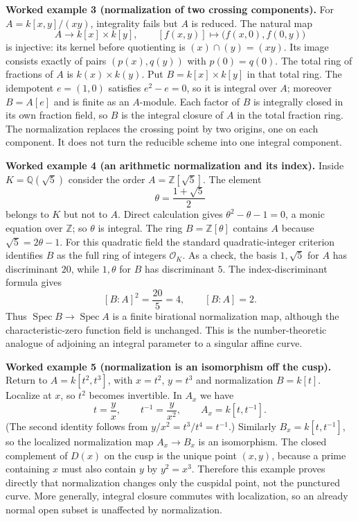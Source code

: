 \par\medskip
\noindent\textbf{Worked example 3 (normalization of two crossing components).}
For $A=k[x,y]/(xy)$, integrality fails but $A$ is reduced.
The natural map
\[
 A\longrightarrow k[x]\times k[y],\qquad
 [f(x,y)]\longmapsto\bigl(f(x,0),f(0,y)\bigr)
\]
is injective: its kernel before quotienting is $(x)\cap(y)=(xy)$.
Its image consists exactly of pairs $(p(x),q(y))$ with
$p(0)=q(0)$.  The total ring of fractions of $A$ is
$k(x)\times k(y)$.  Put $B=k[x]\times k[y]$ in that total ring.
The idempotent $e=(1,0)$ satisfies $e^2-e=0$, so it is integral over
$A$; moreover $B=A[e]$ and is finite as an $A$-module.
Each factor of $B$ is integrally closed in its own fraction field,
so $B$ is the integral closure of $A$ in the total fraction ring.
The normalization replaces the crossing point by two origins, one
on each component.  It does not turn the reducible scheme into one
integral component.

\par\medskip
\noindent\textbf{Worked example 4 (an arithmetic normalization and its index).}
Inside $K=\mathbb Q(\sqrt5)$ consider the order
$A=\mathbb Z[\sqrt5]$.  The element
\[
 \theta=\frac{1+\sqrt5}{2}
\]
belongs to $K$ but not to $A$.  Direct calculation gives
$\theta^2-\theta-1=0$, a monic equation over $\mathbb Z$;
so $\theta$ is integral.  The ring
$B=\mathbb Z[\theta]$ contains $A$ because $\sqrt5=2\theta-1$.
For this quadratic field the standard quadratic-integer criterion
identifies $B$ as the full ring of integers $\mathcal O_K$.
As a check, the basis $1,\sqrt5$ for $A$ has discriminant $20$,
while $1,\theta$ for $B$ has discriminant $5$.
The index-discriminant formula gives
\[
 [B:A]^2=\frac{20}{5}=4,
 \qquad [B:A]=2.
\]
Thus $\operatorname{Spec}B\to\operatorname{Spec}A$ is a finite
birational normalization map, although the characteristic-zero
function field is unchanged.  This is the number-theoretic analogue
of adjoining an integral parameter to a singular affine curve.

\par\medskip
\noindent\textbf{Worked example 5 (normalization is an isomorphism off the cusp).}
Return to $A=k[t^2,t^3]$, with $x=t^2$, $y=t^3$ and normalization
$B=k[t]$.  Localize at $x$, so $t^2$ becomes invertible.
In $A_x$ we have
\[
 t=\frac{y}{x},\qquad
 t^{-1}=\frac{y}{x^2},\qquad
 A_x=k[t,t^{-1}].
\]
(The second identity follows from $y/x^2=t^3/t^4=t^{-1}$.)
Similarly $B_x=k[t,t^{-1}]$, so the localized normalization map
$A_x\to B_x$ is an isomorphism.  The closed complement of $D(x)$
on the cusp is the unique point $(x,y)$, because a prime containing
$x$ must also contain $y$ by $y^2=x^3$.
Therefore this example proves directly that normalization changes
only the cuspidal point, not the punctured curve.  More generally,
integral closure commutes with localization, so an already normal
open subset is unaffected by normalization.
